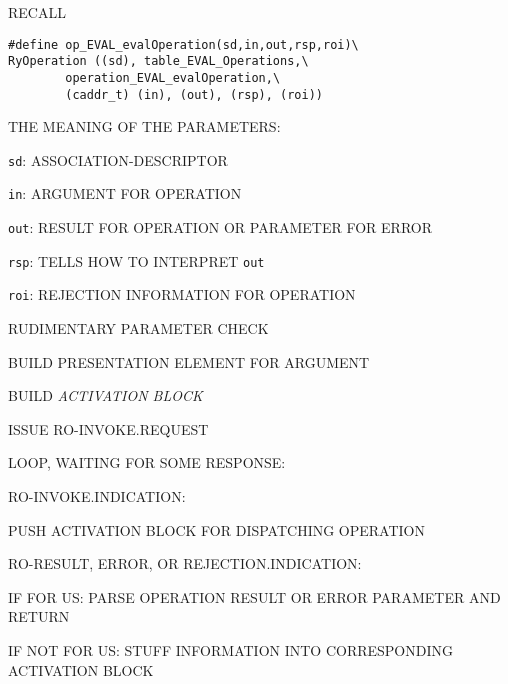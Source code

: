 \begin{bwslide}

\begin{nrtc}
\item	RECALL
\begin{verbatim}
#define op_EVAL_evalOperation(sd,in,out,rsp,roi)\
RyOperation ((sd), table_EVAL_Operations,\
        operation_EVAL_evalOperation,\
        (caddr_t) (in), (out), (rsp), (roi))
\end{verbatim}

\item	THE MEANING OF THE PARAMETERS:
    \begin{nrtc}
    \item	\verb"sd": ASSOCIATION-DESCRIPTOR

    \item	\verb"in": ARGUMENT FOR OPERATION

    \item	\verb"out": RESULT FOR OPERATION OR PARAMETER FOR ERROR

    \item	\verb"rsp": TELLS HOW TO INTERPRET \verb"out"

    \item	\verb"roi": REJECTION INFORMATION FOR OPERATION
    \end{nrtc}
\end{nrtc}
\end{bwslide}


\begin{bwslide}

\begin{nrtc}
\item	RUDIMENTARY PARAMETER CHECK

\item	BUILD PRESENTATION ELEMENT FOR ARGUMENT

\item	BUILD \emph{ACTIVATION BLOCK}

\item	ISSUE RO-INVOKE.REQUEST

\item	LOOP, WAITING FOR SOME RESPONSE:
    \begin{nrtc}
    \item	RO-INVOKE.INDICATION:
	\begin{nrtc}
	\item	 PUSH ACTIVATION BLOCK FOR DISPATCHING OPERATION
	\end{nrtc}

    \item	RO-RESULT, ERROR, OR REJECTION.INDICATION:
	\begin{nrtc}
	\item	IF FOR US: PARSE OPERATION RESULT OR ERROR PARAMETER AND RETURN

	\item	IF NOT FOR US: STUFF INFORMATION INTO CORRESPONDING ACTIVATION
		BLOCK
	\end{nrtc}
    \end{nrtc}
\end{nrtc}
\end{bwslide}


